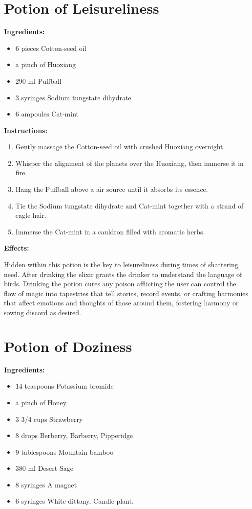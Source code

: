 \documentclass{article}
\begin{document}
\newpage
\section*{Potion of Leisureliness}

\textbf{Ingredients:}

\begin{itemize}
  \item 6 pieces Cotton-seed oil
  \item a pinch of Huoxiang
  \item 290 ml Puffball
  \item 3 syringes Sodium tungstate dihydrate
  \item 6 ampoules Cat-mint
\end{itemize}

\textbf{Instructions:}

\begin{enumerate}
  \item Gently massage the Cotton-seed oil with crushed Huoxiang overnight.
  \item Whisper the alignment of the planets over the Huoxiang, then immerse it in fire.
  \item Hang the Puffball above a air source until it absorbs its essence.
  \item Tie the Sodium tungstate dihydrate and Cat-mint together with a strand of eagle hair.
  \item Immerse the Cat-mint in a cauldron filled with aromatic herbs.
\end{enumerate}

\textbf{Effects:}

Hidden within this potion is the key to leisureliness during times of shattering need. After drinking the elixir grants the drinker to understand the language of birds. Drinking the potion cures any poison afflicting the user can control the flow of magic into tapestries that tell stories, record events, or crafting harmonies that affect emotions and thoughts of those around them, fostering harmony or sowing discord as desired.

\newpage
\section*{Potion of Doziness}

\textbf{Ingredients:}

\begin{itemize}
  \item 14 teaspoons Potassium bromide
  \item a pinch of Honey
  \item 3 3/4 cups Strawberry
  \item 8 drops Berberry, Barberry, Pipperidge
  \item 9 tablespoons Mountain bamboo
  \item 380 ml Desert Sage
  \item 8 syringes A magnet
  \item 6 syringes White dittany, Candle plant.
\end{itemize}
\end{document}
